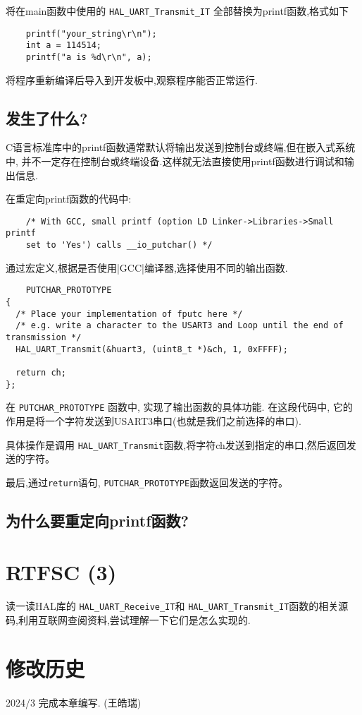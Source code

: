 将在main函数中使用的 \verb|HAL_UART_Transmit_IT| 全部替换为printf函数,格式如下

\begin{lstlisting}
	printf("your_string\r\n");
	int a = 114514;
	printf("a is %d\r\n", a);
\end{lstlisting}

将程序重新编译后导入到开发板中,观察程序能否正常运行.

\subsection{发生了什么?}

C语言标准库中的printf函数通常默认将输出发送到控制台或终端,但在嵌入式系统中,
并不一定存在控制台或终端设备.这样就无法直接使用printf函数进行调试和输出信息.

在重定向printf函数的代码中:

\begin{lstlisting}
	/* With GCC, small printf (option LD Linker->Libraries->Small printf 
	set to 'Yes') calls __io_putchar() */
\end{lstlisting}

通过宏定义,根据是否使用|GCC|编译器,选择使用不同的输出函数.

\begin{lstlisting}
	PUTCHAR_PROTOTYPE 
{ 
  /* Place your implementation of fputc here */ 
  /* e.g. write a character to the USART3 and Loop until the end of transmission */ 
  HAL_UART_Transmit(&huart3, (uint8_t *)&ch, 1, 0xFFFF); 
 
  return ch; 
}; 
\end{lstlisting}

在 \verb|PUTCHAR_PROTOTYPE| 函数中, 实现了输出函数的具体功能.
在这段代码中, 它的作用是将一个字符发送到USART3串口(也就是我们之前选择的串口).

具体操作是调用 \verb|HAL_UART_Transmit|函数,将字符ch发送到指定的串口,然后返回发送的字符。

最后,通过\verb|return|语句, \verb|PUTCHAR_PROTOTYPE|函数返回发送的字符。

\subsection{为什么要重定向printf函数?}

\section{RTFSC (3)}

读一读HAL库的 \verb|HAL_UART_Receive_IT|和 \verb|HAL_UART_Transmit_IT|函数的相关源码,利用互联网查阅资料,尝试理解一下它们是怎么实现的.

\section{修改历史}

2024/3 完成本章编写. (王皓瑞)



